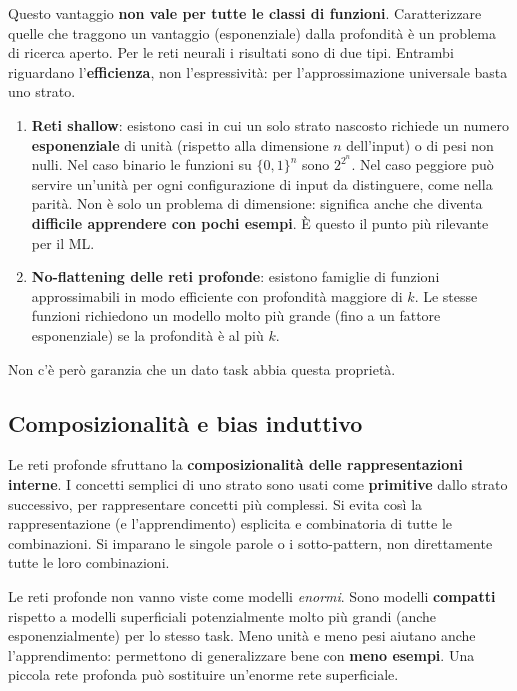 Questo vantaggio \textbf{non vale per tutte le classi di funzioni}. Caratterizzare quelle che traggono un vantaggio
(esponenziale) dalla profondità è un problema di ricerca aperto. Per le reti neurali i risultati sono di due tipi.
Entrambi riguardano l'\textbf{efficienza}, non l'espressività: per l'approssimazione universale basta uno strato.
\begin{enumerate}
  \item \textbf{Reti shallow}: esistono casi in cui un solo strato nascosto richiede un numero
        \textbf{esponenziale} di unità (rispetto alla dimensione $n$ dell'input) o di pesi non nulli. Nel caso
        binario le funzioni su $\{0,1\}^n$ sono $2^{2^n}$. Nel caso peggiore può servire un'unità per ogni
        configurazione di input da distinguere, come nella parità. Non è solo un problema di dimensione: significa
        anche che diventa \textbf{difficile apprendere con pochi esempi}. È questo il punto più rilevante per il
        ML.
  \item \textbf{No-flattening delle reti profonde}: esistono famiglie di funzioni approssimabili in modo efficiente
        con profondità maggiore di $k$. Le stesse funzioni richiedono un modello molto più grande (fino a un fattore
        esponenziale) se la profondità è al più $k$.
\end{enumerate}
Non c'è però garanzia che un dato task abbia questa proprietà.

\subsection{Composizionalità e bias induttivo}
\label{sec:bias-deep}

Le reti profonde sfruttano la \textbf{composizionalità delle rappresentazioni interne}. I concetti semplici di uno
strato sono usati come \textbf{primitive} dallo strato successivo, per rappresentare concetti più complessi. Si
evita così la rappresentazione (e l'apprendimento) esplicita e combinatoria di tutte le combinazioni. Si imparano
le singole parole o i sotto-pattern, non direttamente tutte le loro combinazioni.

\begin{idea}
Le reti profonde non vanno viste come modelli \emph{enormi}. Sono modelli \textbf{compatti} rispetto a modelli
superficiali potenzialmente molto più grandi (anche esponenzialmente) per lo stesso task. Meno unità e meno pesi
aiutano anche l'apprendimento: permettono di generalizzare bene con \textbf{meno esempi}. Una piccola rete profonda
può sostituire un'enorme rete superficiale.
\end{idea}

